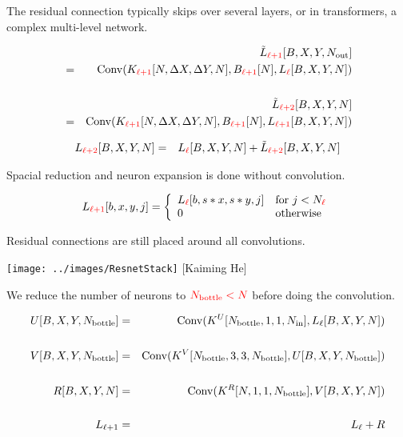 {The residual connection typically skips over several layers, or in transformers, a complex multi-level network.

\vfill
\begin{eqnarray*}
& & \tilde{L}_{\color{red} \ell+1}[B,X,Y,N_{\mathrm{out}}] \\
& = & \mathrm{Conv}(K_{\color{red} \ell+1}[N,\Delta X,\Delta Y,N],B_{\color{red} \ell+1}[N],L_{\color{red} \ell}[B,X,Y,N]) \\
\\
& & \tilde{L}_{\color{red} \ell+2}[B,X,Y,N] \\
& = & \mathrm{Conv}(K_{\color{red} \ell+1}[N,\Delta X,\Delta Y,N],B_{\color{red} \ell+1}[N],L_{\color{red} \ell+1}[B,X,Y,N])
\end{eqnarray*}

\vfill
\begin{eqnarray*}
L_{\color{red} \ell+2}[B,X,Y,N] & = & L_{\color{red}\ell}[B,X,Y,N] + \tilde{L}_{\color{red} \ell+2}[B,X,Y,N]
\end{eqnarray*}



Spacial reduction and neuron expansion is done without convolution.

\vfill

$$L_{\color{red} \ell+1}[b,x,y,j]  =  \left\{\begin{array}{ll} L_{\color{red} \ell}[b,s*x,s*y,j] & \mbox{for $j < N_{\color{red} \ell}$} \\ 0 & \mbox{otherwise} \end{array}\right.$$

\vfill
Residual connections are still placed around all convolutions.


\centerline{\texttt{[image: ../images/ResnetStack]} {\large [Kaiming He]}}



We reduce the number of neurons to ${\color{red} N_{\mathrm{bottle}} < N}$ before doing the convolution.

{\huge
\begin{eqnarray*}
U[B,X,Y,N_{\mathrm{bottle}}] & = & \mathrm{Conv}(K^U[N_{\mathrm{bottle}},1,1,N_{\mathrm{in}}],L_\ell[B,X,Y,N]) \\
\\
V[B,X,Y,N_{\mathrm{bottle}}] & = & \mathrm{Conv}(K^V[N_{\mathrm{bottle}},3,3,N_\mathrm{bottle}],U[B,X,Y,N_{\mathrm{bottle}}]) \\
\\
R[B,X,Y,N] & = & \mathrm{Conv}(K^R[N,1,1,N_{\mathrm{bottle}}],V[B,X,Y,N]) \\
\\
L_{ \ell+1} & = & L_\ell + R
\end{eqnarray*}
}

}

